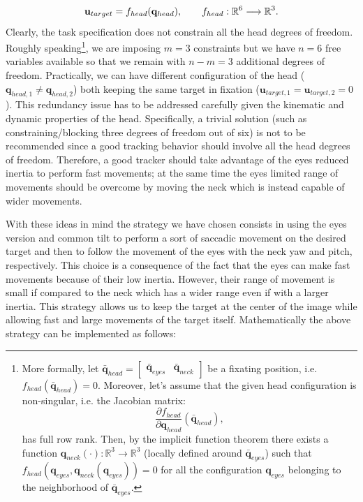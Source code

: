 \begin{eqnarray*}
\mathbf{u}_{target} = f_{head} (\mathbf q_{head}), \qquad f_{head} : \mathbb R^6 \longrightarrow \mathbb R^3.
\end{eqnarray*}
Clearly, the task specification does not constrain all the head degrees of freedom. Roughly speaking\footnote{More formally, let $\bar {\mathbf q}_{head} = \begin{bmatrix} \bar {\mathbf q}_{eyes} & \bar {\mathbf q}_{neck} \end{bmatrix}$ be a fixating position, i.e. $f_{head}(\bar {\mathbf q}_{head}) = 0$. Moreover, let's assume that the given head configuration is non-singular, i.e. the Jacobian matrix: $$\frac{\partial f_{head}}{\partial \mathbf q_{head}}(\bar {\mathbf q}_{head}),$$ has full row rank. Then, by the implicit function theorem there exists a function $\mathbf q_{neck}(\cdot): \mathbb R^3 \longrightarrow \mathbb R^3$ (locally defined around $\bar {\mathbf q}_{eyes}$) such that $f_{head}({\mathbf q}_{eyes}, {\mathbf q}_{neck} ({\mathbf q}_{eyes}) ) = 0$ for all the configuration ${\mathbf q}_{eyes}$ belonging to the neighborhood of $\bar {\mathbf q}_{eyes}$.}, we are imposing $m=3$ constraints but we have $n=6$ free variables available so that we remain with $n-m=3$ additional degrees of freedom. Practically, we can have different configuration of the head ($\mathbf q_{head,1} \neq \mathbf q_{head,2}$) both keeping the same target in fixation (${\mathbf u}_{target,1} = {\mathbf u}_{target,2} = 0$). This redundancy issue has to be addressed carefully given the kinematic and dynamic properties of the head. Specifically, a trivial solution (such as constraining/blocking three degrees of freedom out of six) is not to be recommended since a good tracking behavior should involve all the  head degrees of freedom. Therefore, a good tracker should take advantage of the eyes reduced inertia to perform fast movements; at the same time the eyes limited range of movements should be overcome by moving the neck which is instead capable of wider movements.

With these ideas in mind the strategy we have chosen consists in using the eyes version and common tilt to perform a sort of saccadic movement on the desired target and then to follow the movement of the eyes with the neck yaw and pitch, respectively. This choice is a consequence of the fact that the eyes can make fast movements because of their low inertia. However, their range of movement is small if compared to the neck which has a wider range even if with a larger inertia. This strategy allows us to keep the target at the center of the image while allowing fast and large movements of the target itself. Mathematically the above strategy can be implemented as follows:

